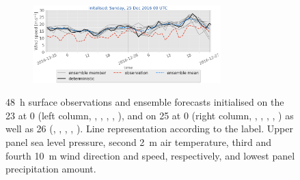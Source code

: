 \begin{figure}[H]
	\begin{subfigure}[b]{\textwidth}
		\centering
		\includegraphics[trim={5.5cm 0cm 5.cm 17.2cm},clip,
		width=0.8\textwidth]{./fig_sfc_ws/20161225_00}
	\end{subfigure}
    \caption{\SI{48}{\hour} surface observations and ensemble forecasts initialised on the \SI{23}{\dec} at \SI{0}{\UTC} (left column, \protect{}, \protect{}, \protect{}, \protect{}, \protect{}), and on \SI{25}{\dec} at \SI{0}{\UTC} (right column, \protect{}, \protect{}, \protect{}, \protect{}, \protect{}) as well as \SI{26}{\dec} (\protect{}, \protect{}, \protect{}, \protect{}, \protect{}). Line representation according to the label. Upper panel sea level pressure, second \SI{2}{\metre} air temperature, third and fourth \SI{10}{\metre} wind direction and speed, respectively, and lowest panel precipitation amount. }\label{fig:res:sfc_obs_meps}
\end{figure}
